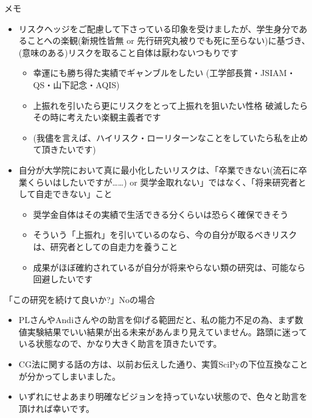 \documentclass[13pt,aspectratio=169,table,dvipdfmx]{beamer}
\begin{document}
    \begin{frame}{メモ}
        \begin{itemize}
            \item リスクヘッジをご配慮して下さっている印象を受けましたが、学生身分であることへの楽観(新規性皆無 or 先行研究丸被りでも死に至らない)に基づき、(意味のある)リスクを取ること自体は厭わないつもりです
                  \begin{itemize}
                      \item 幸運にも勝ち得た実績でギャンブルをしたい (工学部長賞・JSIAM・QS・山下記念・AQIS)
                      \item 上振れを引いたら更にリスクをとって上振れを狙いたい性格 破滅したらその時に考えたい楽観主義者です
                      \item (我儘を言えば、ハイリスク・ローリターンなことをしていたら私を止めて頂きたいです)
                  \end{itemize}
            \item 自分が大学院において真に最小化したいリスクは、「卒業できない(流石に卒業くらいはしたいですが……) or 奨学金取れない」ではなく、「将来研究者として自走できない」こと
                  \begin{itemize}
                      \item 奨学金自体はその実績で生活できる分くらいは恐らく確保できそう
                      \item そういう「上振れ」を引いているのなら、今の自分が取るべきリスクは、研究者としての自走力を養うこと
                      \item 成果がほぼ確約されているが自分が将来やらない類の研究は、可能なら回避したいです
                  \end{itemize}
        \end{itemize}
    \end{frame}
    \begin{frame}{「この研究を続けて良いか?」Noの場合}
        \begin{itemize}
            \item PLさんやAndiさんやの助言を仰げる範囲だと、私の能力不足の為、まず数値実験結果でいい結果が出る未来があんまり見えていません。路頭に迷っている状態なので、かなり大きく助言を頂きたいです。
            \item CG法に関する話の方は、以前お伝えした通り、実質SciPyの下位互換なことが分かってしまいました。
            \item いずれにせよあまり明確なビジョンを持っていない状態ので、色々と助言を頂ければ幸いです。
        \end{itemize}
    \end{frame}
\end{document}
